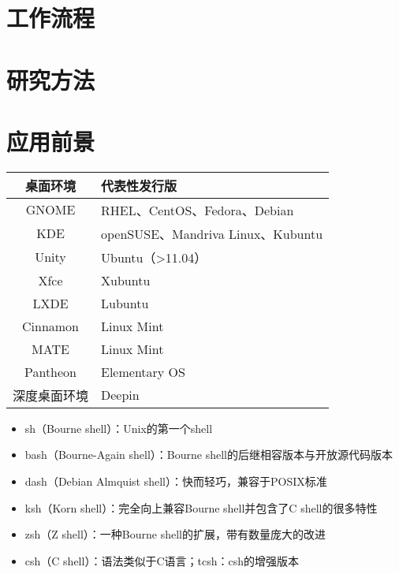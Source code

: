\section{工作流程}

\section{研究方法}

\section{应用前景}



  \begin{figure}
    \centering
  \end{figure}

  \begin{table}
    \centering
    \begin{tabular}{cl}
      \hline
      \rowcolor{blue!50}桌面环境 & 代表性发行版\\
      \hline
      GNOME & RHEL、CentOS、Fedora、Debian\\
      KDE & openSUSE、Mandriva Linux、Kubuntu\\
      Unity & Ubuntu（>11.04）\\
      Xfce & Xubuntu\\
      LXDE & Lubuntu\\
      Cinnamon & Linux Mint\\
      MATE & Linux Mint\\
      Pantheon & Elementary OS\\
      深度桌面环境 & Deepin\\
      \hline
    \end{tabular}
  \end{table}

  \begin{itemize}[<+->]
    \item sh（Bourne shell）：Unix的第一个shell
    \item bash（Bourne-Again shell）：Bourne shell的后继相容版本与开放源代码版本
    \item dash（Debian Almquist shell）：快而轻巧，兼容于POSIX标准
    \item ksh（Korn shell）：完全向上兼容Bourne shell并包含了C shell的很多特性
    \item zsh（Z shell）：一种Bourne shell的扩展，带有数量庞大的改进
    \item csh（C shell）：语法类似于C语言；tcsh：csh的增强版本
  \end{itemize}

